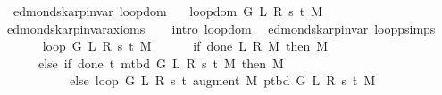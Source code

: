 \begin{isabellebody}
%
\endisatagvisible
{\isafoldvisible}%
%
\isadelimvisible
\isanewline
%
\endisadelimvisible
%
\isadeliminvisible
\isanewline
%
\endisadeliminvisible
%
\isataginvisible
{}\isamarkupfalse%
\ {\isacharparenleft}{\kern0pt}\ edmonds{\isacharunderscore}{\kern0pt}karp{\isacharunderscore}{\kern0pt}invar{\isacharparenright}{\kern0pt}\ loop{\isacharprime}{\kern0pt}{\isacharunderscore}{\kern0pt}dom{\isacharcolon}{\kern0pt}\isanewline
\ \ \ {\isachardoublequoteopen}loop{\isacharprime}{\kern0pt}{\isacharunderscore}{\kern0pt}dom\ {\isacharparenleft}{\kern0pt}G{\isacharcomma}{\kern0pt}\ L{\isacharcomma}{\kern0pt}\ R{\isacharcomma}{\kern0pt}\ s{\isacharcomma}{\kern0pt}\ t{\isacharcomma}{\kern0pt}\ M{\isacharparenright}{\kern0pt}{\isachardoublequoteclose}%
\endisataginvisible
{\isafoldinvisible}%
%
\isadeliminvisible
\isanewline
%
\endisadeliminvisible
%
\isadelimproof
\ \ %
\endisadelimproof
%
\isatagproof
{}\isamarkupfalse%
\ edmonds{\isacharunderscore}{\kern0pt}karp{\isacharunderscore}{\kern0pt}invar{\isacharunderscore}{\kern0pt}axioms\isanewline
\ \ \isamarkupfalse%
\ {\isacharparenleft}{\kern0pt}intro\ loop{\isacharprime}{\kern0pt}{\isacharunderscore}{\kern0pt}dom{\isacharparenright}{\kern0pt}%
\endisatagproof
{\isafoldproof}%
%
\isadelimproof
\isanewline
%
\endisadelimproof
%
\isadeliminvisible
\isanewline
%
\endisadeliminvisible
%
\isataginvisible
{}\isamarkupfalse%
\ {\isacharparenleft}{\kern0pt}\ edmonds{\isacharunderscore}{\kern0pt}karp{\isacharunderscore}{\kern0pt}invar{\isacharparenright}{\kern0pt}\ loop{\isacharprime}{\kern0pt}{\isacharunderscore}{\kern0pt}psimps{\isacharcolon}{\kern0pt}\isanewline
\ \ \isanewline
\ \ \ \ {\isachardoublequoteopen}loop{\isacharprime}{\kern0pt}\ G\ L\ R\ s\ t\ M\ {\isacharequal}{\kern0pt}\isanewline
\ \ \ \ \ {\isacharparenleft}{\kern0pt}if\ done{\isacharunderscore}{\kern0pt}{}\ L\ R\ M\ then\ M\isanewline
\ \ \ \ \ \ else\ if\ done{\isacharunderscore}{\kern0pt}{}\ t\ {\isacharparenleft}{\kern0pt}m{\isacharunderscore}{\kern0pt}tbd\ G\ L\ R\ s\ t\ M{\isacharparenright}{\kern0pt}\ then\ M\isanewline
\ \ \ \ \ \ \ \ \ \ \ else\ loop{\isacharprime}{\kern0pt}\ G\ L\ R\ s\ t\ {\isacharparenleft}{\kern0pt}augment\ M\ {\isacharparenleft}{\kern0pt}p{\isacharunderscore}{\kern0pt}tbd\ G\ L\ R\ s\ t\ M{\isacharparenright}{\kern0pt}{\isacharparenright}{\kern0pt}{\isacharparenright}{\kern0pt}{\isachardoublequoteclose}%
\endisataginvisible
{\isafoldinvisible}%
%
\isadeliminvisible
\isanewline

\end{isabellebody}
